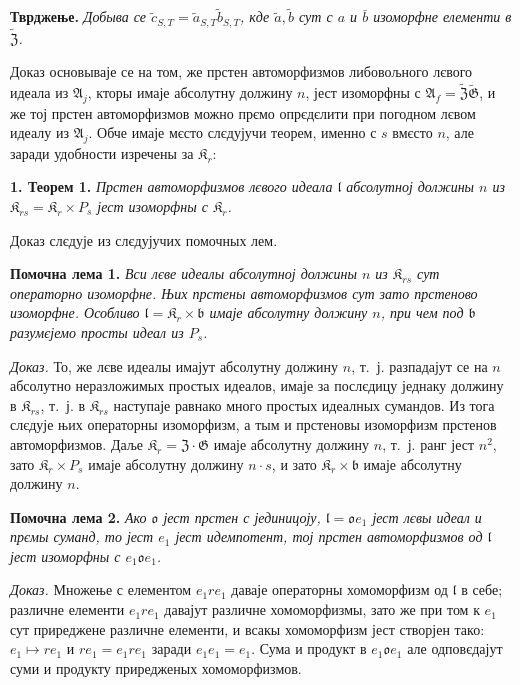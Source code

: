 \documentclass[11pt]{article}
\begin{document}
\noindent\textbf{Тврджење.} \emph{Добыва се \(\tilde c_{S,T}=\tilde a_{S,T}\tilde b_{S,T}\), кде \(\tilde a,\tilde b\) сут с \(a\) и \(\bar b\) изоморфне елементи в \(\widetilde{\mathfrak Z}\).}

Доказ основываје се на том, же прстен автоморфизмов либовољного лєвого идеала из \(\mathfrak A_j\), кторы имаје абсолутну должину \(n\), јест изоморфны с \(\mathfrak A_f=\widetilde{\mathfrak Z}\widetilde{\mathfrak G}\), и же тој прстен автоморфизмов можно прємо опрєдєлити при погодном лєвом идеалу из \(\mathfrak A_j\). Обче имаје мєсто слєдујучи теорем, именно с \(s\) вмєсто \(n\), але заради удобности изречены за \(\mathfrak K_r\):

\noindent\textbf{1. Теорем 1.} \emph{Прстен автоморфизмов лєвого идеала \(\mathfrak l\) абсолутној должины \(n\) из \(\mathfrak K_{rs}=\mathfrak K_r\times P_s\) јест изоморфны с \(\mathfrak K_r\).}

Доказ слєдује из слєдујучих помочных лем.

\noindent\textbf{Помочна лема 1.} \emph{Вси лєве идеалы абсолутној должины \(n\) из \(\mathfrak K_{rs}\) сут операторно изоморфне. Њих прстены автоморфизмов сут зато прстеново изоморфне. Особливо \(\mathfrak l=\mathfrak K_r\times\mathfrak b\) имаје абсолутну должину \(n\), при чем под \(\mathfrak b\) разумєјемо просты идеал из \(P_s\).}

\noindent\emph{Доказ.} То, же лєве идеалы имајут абсолутну должину \(n\), т.~ј. разпадајут се на \(n\) абсолутно неразложимых простых идеалов, имаје за послєдицу једнаку должину в \(\mathfrak K_{rs}\), т.~ј. в \(\mathfrak K_{rs}\) наступаје равнако много простых идеалных сумандов. Из тога слєдује њих операторны изоморфизм, а тым и прстеновы изоморфизм прстенов автоморфизмов. Даље \(\mathfrak K_r=\mathfrak Z\cdot\mathfrak G\) имаје абсолутну должину \(n\), т.~ј. ранг јест \(n^2\), зато \(\mathfrak K_r\times P_s\) имаје абсолутну должину \(n\cdot s\), и зато \(\mathfrak K_r\times\mathfrak b\) имаје абсолутну должину \(n\).

\noindent\textbf{Помочна лема 2.} \emph{Ако \(\mathfrak o\) јест прстен с јединицоју, \(\mathfrak l=\mathfrak o e_1\) јест лєвы идеал и прємы суманд, то јест \(e_1\) јест идемпотент, тој прстен автоморфизмов од \(\mathfrak l\) јест изоморфны с \(e_1\mathfrak o e_1\).}

\noindent\emph{Доказ.} Множење с елементом \(e_1re_1\) даваје операторны хомоморфизм од \(\mathfrak l\) в себе; различне елементи \(e_1re_1\) давајут различне хомоморфизмы, зато же при том к \(e_1\) сут приреджене различне елементи, и всакы хомоморфизм јест створјен тако: \(e_1\mapsto re_1\) и \(re_1=e_1re_1\) заради \(e_1e_1=e_1\). Сума и продукт в \(e_1\mathfrak o e_1\) але одповєдајут суми и продукту приредженых хомоморфизмов.
\end{document}
